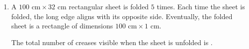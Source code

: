 \documentclass[a4paper, 11pt]{article}
\begin{document}
\begin{enumerate}
    \item A $100\text{ cm} \times 32\text{ cm}$ rectangular sheet is folded $5$ times. Each time the sheet is folded, the long edge aligns with its opposite side. Eventually, the folded sheet is a rectangle of dimensions $100\text{ cm} \times 1\text{ cm}$.
    
    The total number of creases visible when the sheet is unfolded is \underline{\hspace{2cm}}.
    
    \begin{enumerate}
    \end{enumerate}

    \hfill{}

\end{enumerate}
\end{document}
